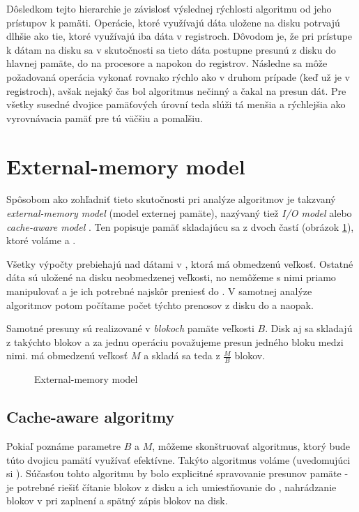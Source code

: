 
Dôsledkom tejto hierarchie je závislosť výslednej rýchlosti algoritmu od jeho prístupov k pamäti. Operácie, ktoré využívajú dáta uložene na disku potrvajú dlhšie ako tie, ktoré využívajú iba dáta v registroch. Dôvodom je, že pri prístupe k dátam na disku sa v skutočnosti sa tieto dáta postupne presunú z disku do hlavnej pamäte, do \cache na procesore a napokon do registrov. Následne sa môže požadovaná operácia vykonať rovnako rýchlo ako v druhom prípade (keď už je v registroch), avšak nejaký čas bol algoritmus nečinný a čakal na presun dát. Pre všetky susedné dvojice pamäťových úrovní teda slúži tá menšia a rýchlejšia ako vyrovnávacia pamäť pre tú väčšiu a pomalšiu. 

\section{External-memory model} \label{sec:extmem}
Spôsobom ako zohľadniť tieto skutočnosti pri analýze algoritmov je takzvaný \emph{external-memory model} (model externej pamäte), nazývaný tiež \emph{I/O model} alebo \emph{cache-aware model} \citep{aggarwal1988input}. Ten popisuje pamäť skladajúcu sa z dvoch častí (obrázok \ref{fig:exmem_model}), ktoré voláme \cache a \disk.

Všetky výpočty prebiehajú nad dátami v \cache, ktorá má obmedzenú veľkosť. Ostatné dáta sú uložené na disku neobmedzenej veľkosti, no nemôžeme s nimi priamo manipulovať a je ich potrebné najskôr preniesť do \cache. V samotnej analýze algoritmov potom počítame počet týchto prenosov z disku do \cache a naopak.

Samotné presuny sú realizované v \emph{blokoch} pamäte veľkosti $B$. Disk aj \cache sa skladajú z takýchto blokov a za jednu operáciu považujeme presun jedného bloku medzi nimi. \Cache má obmedzenú veľkosť $M$ a skladá sa teda z $\frac{M}{B}$ blokov.  

\begin{figure}
    \centering
    \resizebox{0.8\textwidth}{!}{%
            
    }
    \caption{External-memory model}
    \label{fig:exmem_model}
\end{figure}

\subsection{Cache-aware algoritmy}
Pokiaľ poznáme parametre $B$ a $M$, môžeme skonštruovať algoritmus, ktorý bude túto dvojicu pamätí využívať efektívne. Takýto algoritmus voláme \aware (uvedomujúci si \cache). Súčasťou tohto algoritmu by bolo explicitné spravovanie presunov pamäte - je potrebné riešiť čítanie blokov z disku a ich umiestňovanie do \cache, nahrádzanie blokov v \cache pri zaplnení a spätný zápis blokov na disk.

